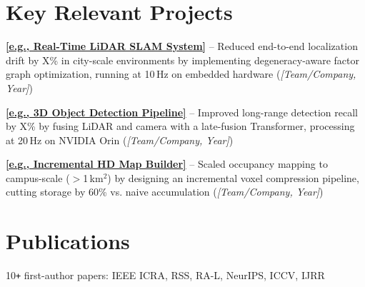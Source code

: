 \documentclass[]{deedy-resume-openfont}
\begin{document}
\begin{minipage}[t]{0.66\textwidth}
\section{Key Relevant Projects}
\vspace{0.3cm}
\begin{tightemize}
\item \href{https://github.com/your-org/lidar-slam}{\textbf{[e.g., Real-Time LiDAR SLAM System]}} -- Reduced end-to-end localization drift by X\% in city-scale environments by implementing degeneracy-aware factor graph optimization, running at 10\,Hz on embedded hardware (\textit{[Team/Company, Year]})
\item \href{https://github.com/your-org/3d-detector}{\textbf{[e.g., 3D Object Detection Pipeline]}} -- Improved long-range detection recall by X\% by fusing LiDAR and camera with a late-fusion Transformer, processing at 20\,Hz on NVIDIA Orin (\textit{[Team/Company, Year]})
\item \href{https://github.com/your-org/hd-map}{\textbf{[e.g., Incremental HD Map Builder]}} -- Scaled occupancy mapping to campus-scale ($>$1\,km$^2$) by designing an incremental voxel compression pipeline, cutting storage by 60\% vs. naive accumulation (\textit{[Team/Company, Year]})
\end{tightemize}
\sectionsep

\section{Publications}
10\texttt{+} first-author papers: IEEE ICRA, RSS, RA-L, NeurIPS, ICCV, IJRR
\sectionsep


\end{minipage}
\end{document}
